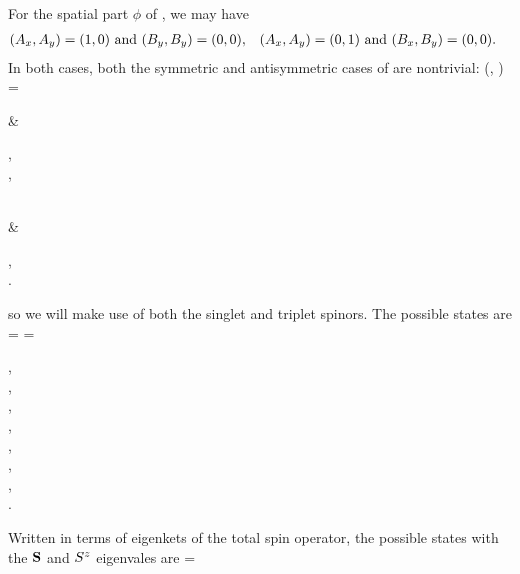 \begin{solution}
	For the spatial part $\phi$ of , we may have
	\begin{align*}
		(A_x, A_y) = (1, 0) &\text{ and } (B_y, B_y) = (0, 0), &
		(A_x, A_y) = (0, 1) &\text{ and } (B_x, B_y) = (0, 0).
	\end{align*}
	In both cases, both the symmetric and antisymmetric cases of  are nontrivial:
	\beq
		\phi(\vxq, \vxw) =  \begin{cases}
			  \pm {}  & \begin{cases} , \\ , \end{cases} \\[3ex]
			  \pm {}  & \begin{cases} , \\ . \end{cases}
		\end{cases}
	\eeq
	so we will make use of both the singlet and triplet spinors.  The possible states are
	\beq
		\kpsi = \ket{\nxq, \nxw} \ket{\nyq, \nyw} \ket{\sq, \sw}
		= \begin{cases}
			 , \\[2ex]
			 \ket{+ +}, \\[2ex]
			 , \\[2ex]
			 \ket{- -}, \\[2ex]
			 , \\[2ex]
			 \ket{+ +}, \\[2ex]
			 , \\[2ex]
			 \ket{- -}.
		\end{cases}
	\eeq
	Written in terms of eigenkets of the total spin operator, the possible states with the $\vb{S}$ and $S^z$ eigenvales are
	\beq
		\kpsi = \ket{\nxq, \nxw} \ket{\nyq, \nyw} 

\end{solution}
